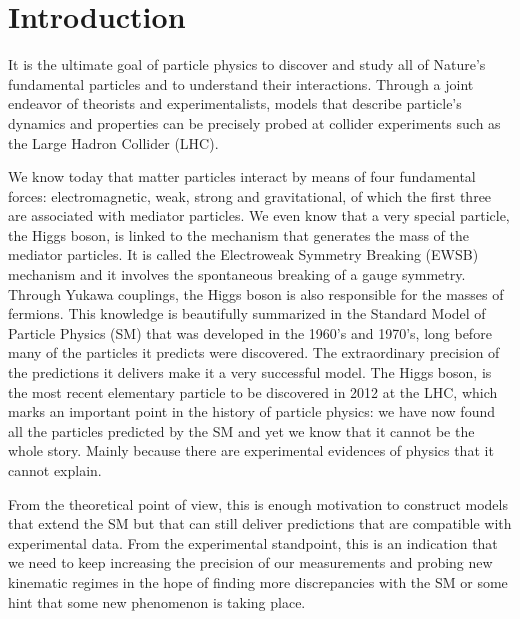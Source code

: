 
\chapter{Introduction}
\label{chapter:introduction}

It is the ultimate goal of particle physics to discover and study all of Nature's fundamental particles and to understand their interactions. Through a joint endeavor of theorists and experimentalists, models that describe particle's dynamics and properties can be precisely probed at collider experiments such as the Large Hadron Collider (LHC). 

We know today that matter particles interact by means of four fundamental forces: electromagnetic, weak, strong and gravitational, of which the first three are associated with mediator particles. We even know that a very special particle, the Higgs boson, is linked to the mechanism that generates the mass of the mediator particles. It is called the Electroweak Symmetry Breaking (EWSB) mechanism and it involves the spontaneous breaking of a gauge symmetry. Through Yukawa couplings, the Higgs boson is also responsible for the masses of fermions. This knowledge is beautifully summarized in the Standard Model of Particle Physics (SM) that was developed in the 1960's and 1970's, long before many of the particles it predicts were discovered. The extraordinary precision of the predictions it delivers make it a very successful model. The Higgs boson, is the most recent elementary particle to be discovered in 2012 at the LHC, which marks an important point in the history of particle physics: we have now found all the particles predicted by the SM and yet we know that it cannot be the whole story. Mainly because there are experimental evidences of physics that it cannot explain.

From the theoretical point of view, this is enough motivation to construct models that extend the SM but that can still deliver predictions that are compatible with experimental data. From the experimental standpoint, this is an indication that we need to keep increasing the precision of our measurements and probing new kinematic regimes in the hope of finding more discrepancies with the SM or some hint that some new phenomenon is taking place.

